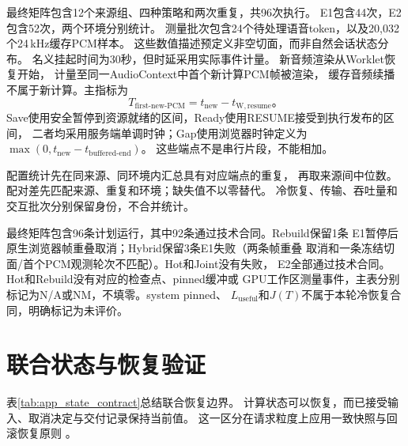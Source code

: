最终矩阵包含12个来源组、四种策略和两次重复，共96次执行。
E1包含44次，E2包含52次，两个环境分别统计。
测量批次包含24个待处理语音token，以及20,032个24\,kHz缓存PCM样本。
这些数值描述预定义非空切面，而非自然会话状态分布。
名义挂起时间为30秒，但时延采用实际事件计量。
新音频渲染从Worklet恢复开始，
计量至同一AudioContext中首个新计算PCM帧被渲染，
缓存音频续播不属于新计算。主指标为
\[
T_{\mathrm{first\text{-}new\text{-}PCM}}
=t_{\mathrm{new}}-t_{\mathrm{W,resume}}。
\]
Save使用安全暂停到资源就绪的区间，Ready使用RESUME接受到执行发布的区间，
二者均采用服务端单调时钟；Gap使用浏览器时钟定义为
$\max(0,t_{\mathrm{new}}-t_{\mathrm{buffered\text{-}end}})$。
这些端点不是串行片段，不能相加。

配置统计先在同来源、同环境内汇总具有对应端点的重复，
再取来源间中位数。配对差先匹配来源、重复和环境；缺失值不以零替代。
冷恢复、传输、吞吐量和交互批次分别保留身份，不合并统计。

最终矩阵包含96条计划运行，其中92条通过技术合同。Rebuild保留1条
E1暂停后原生浏览器帧重叠取消；Hybrid保留3条E1失败（两条帧重叠
取消和一条冻结切面/首个PCM观测轮次不匹配）。Hot和Joint没有失败，
E2全部通过技术合同。Hot和Rebuild没有对应的检查点、pinned缓冲或
GPU工作区测量事件，主表分别标记为N/A或NM，不填零。system pinned、
$L_{\mathrm{useful}}$和$J(T)$不属于本轮冷恢复合同，明确标记为未评价。


\section{联合状态与恢复验证}
\label{app:state_contract}

表\ref{tab:app_state_contract}总结联合恢复边界。
计算状态可以恢复，而已接受输入、取消决定与交付记录保持当前值。
这一区分在请求粒度上应用一致快照与回滚恢复原则
\citep{chandy1985,elnozahy2002}。

